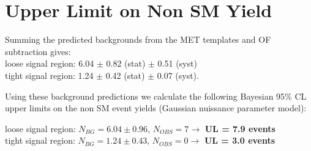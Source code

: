 \section{Upper Limit on Non SM Yield}
\label{sec:upperlimit}

Summing the predicted backgrounds from the MET templates and OF subtraction gives: \\
loose signal region:  6.04 $\pm$ 0.82 (stat) $\pm$ 0.51 (syst)  \\
tight signal region:  1.24 $\pm$ 0.42 (stat) $\pm$ 0.07 (syst).

Using these background predictions we calculate the following Bayesian 95\% CL
upper limits on the non SM event yields (Gaussian nuissance parameter model):

loose signal region: $N_{BG} = 6.04 \pm 0.96$, $N_{OBS} = 7 \rightarrow$ {\bf UL = 7.9 events} \\
tight signal region: $N_{BG} = 1.24 \pm 0.43$, $N_{OBS} = 0 \rightarrow$ {\bf UL = 3.0 events} \\
